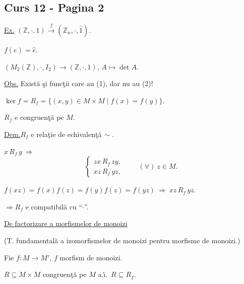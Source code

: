 
\subsection*{Curs 12 - Pagina 2}

\noindent\underline{Ex.}\quad
$(\mathbb{Z},\cdot,1)\xrightarrow{\ f\ }(\mathbb{Z}_n,\cdot,\hat 1)$.

\noindent $f(e)=\hat e$.

\bigskip
\noindent
$(M_2(\mathbb{Z}),\cdot,I_2)\longrightarrow(\mathbb{Z},\cdot,1)$,
\qquad $A\longmapsto\det A$.

\bigskip
\noindent\underline{Obs.}\quad
Exist\u{a} \c{s}i func\c{t}ii care au (1), dar nu au (2)!

\bigskip
\noindent $\ker f=R_f=\{(x,y)\in M\times M\mid f(x)=f(y)\}$.

\noindent $R_f$ e congruen\c{t}\u{a} pe $M$.

\bigskip
\noindent\underline{Dem.}\quad $R_f$ e rela\c{t}ie de echivalen\c{t}\u{a}$\,\sim$.

\medskip
\noindent $x\,R_f\,y\ \Longrightarrow$
\[
\begin{cases}
 zx\,R_f\,zy,\\
 xz\,R_f\,yz,
\end{cases}
\qquad (\forall)\ z\in M.
\]

\noindent
$f(xz)=f(x)f(z)=f(y)f(z)=f(yz)\ \Longrightarrow\ xz\,R_f\,yz$.

\medskip
\noindent $\Longrightarrow R_f$ e compatibil\u{a} cu ``$\cdot$''.

\bigskip
\noindent{}\quad
\underline{De factorizare a morfismelor de monoizi}

\noindent (T. fundamental\u{a} a izomorfismelor de monoizi pentru morfisme de monoizi.)

\bigskip
\noindent Fie $f:M\longrightarrow M'$, $f$ morfism de monoizi.

\noindent $R\subseteq M\times M$ congruen\c{t}\u{a} pe $M$ a.\^{\i}.\ $R\subseteq R_f$.


